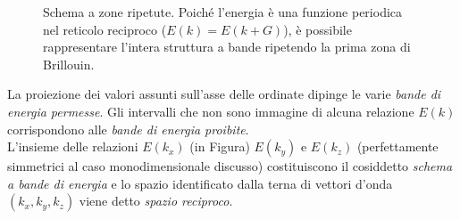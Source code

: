 \documentclass[a4paper,11pt]{report}
\begin{document}
\begin{figure}[h!]
    \caption{Schema a zone ripetute. Poiché l'energia è una funzione periodica nel reticolo reciproco ($E(k) = E(k + G)$), è possibile rappresentare l'intera struttura a bande ripetendo la prima zona di Brillouin.}
    \label{fig:band_structure_repeated}
\end{figure}

\noindent
La proiezione dei valori assunti sull'asse delle ordinate dipinge le varie \textit{bande di energia permesse}. Gli intervalli che non sono immagine di alcuna relazione $E(k)$ corrispondono alle \textit{bande di energia proibite}. \\
L'insieme delle relazioni $E(k_x)$ (in Figura) $E(k_y)$ e $E(k_z)$ (perfettamente simmetrici al caso monodimensionale discusso) costituiscono il cosiddetto \textit{schema a bande di energia} e lo spazio identificato dalla terna di vettori d'onda $(k_x,k_y,k_z)$ viene detto \textit{spazio reciproco}.
\end{document}
